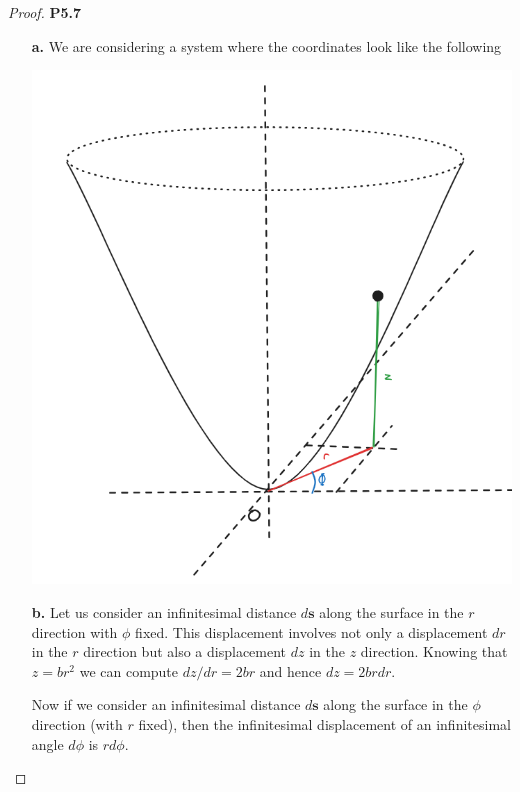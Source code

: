 \documentclass[11pt]{article}
\theoremstyle{definition}
\begin{document}
\cleardoublepage
\begin{proof}{\textbf{P5.7}}
    \begin{itemize}
    \item [\bf{a.}] We are considering a system where the coordinates look like
    the following
    \begin{center}
        \includegraphics*[scale=0.5]{ch5_p5.7.png}
    \end{center}
\cleardoublepage
    \item [\bf{b.}]
    Let us consider an infinitesimal distance $d\bm s$ along the surface
    in the $r$ direction with $\phi$ fixed.
    This displacement involves not only a displacement $dr$ in the $r$ direction
    but also a displacement $dz$ in the $z$ direction. Knowing that $z = br^2$
    we can compute $dz/dr = 2br$ and hence $dz = 2brdr$.

    Now if we consider an infinitesimal distance $d\bm s$ along the surface
    in the $\phi$ direction (with $r$ fixed), then the infinitesimal displacement
    of an infinitesimal angle $d\phi$ is $rd\phi$.
 

\end{itemize}
\end{proof}
\end{document}
